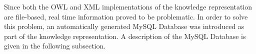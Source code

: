 


%
%
%
%
%
Since both the OWL and XML implementations of the knowledge representation are file-based, real time information proved to be problematic. In order to solve this problem, an automatically generated \textsf{MySQL Database} \cite{MySQL} was introduced as part of the knowledge representation. A description of the \textsf{MySQL Database} is given in the following subsection.


